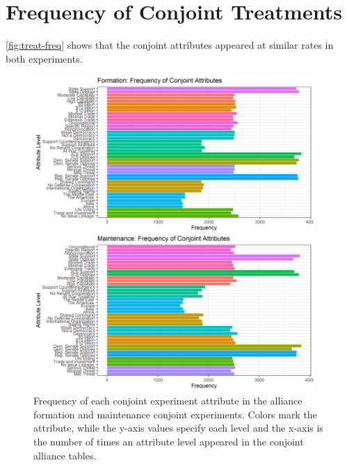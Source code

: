 \documentclass[12pt]{article}
\begin{document}
\section{Frequency of Conjoint Treatments}

\autoref{fig:treat-freq} shows that the conjoint attributes appeared at similar rates in both experiments. 
 
\begin{figure}[htbp]
	\centering
		\includegraphics[width=0.95\textwidth]{treat-freq.png}
	\caption{Frequency of each conjoint experiment attribute in the alliance formation and maintenance conjoint experiments. Colors mark the attribute, while the y-axis values specify each level and the x-axis is the number of times an attribute level appeared in the conjoint alliance tables.}
	\label{fig:treat-freq}
\end{figure}


\newpage 
 
 
\end{document}
